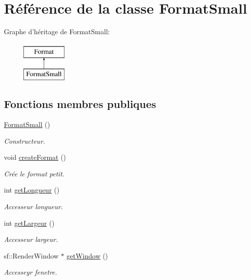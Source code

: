 \hypertarget{classFormatSmall}{\section{Référence de la classe Format\+Small}
\label{classFormatSmall}
}
Graphe d'héritage de Format\+Small\+:\begin{figure}[H]
\begin{center}
\leavevmode
\includegraphics[height=2.000000cm]{classFormatSmall}
\end{center}
\end{figure}
\subsection*{Fonctions membres publiques}
\begin{DoxyCompactItemize}
\item 
\hypertarget{classFormatSmall_aca8b600f88876ec205174cc61e65cca2}{\hyperlink{classFormatSmall_aca8b600f88876ec205174cc61e65cca2}{Format\+Small} ()}\label{classFormatSmall_aca8b600f88876ec205174cc61e65cca2}

\begin{DoxyCompactList}\small\item\em Constructeur. \end{DoxyCompactList}\item 
void \hyperlink{classFormatSmall_a985c6ed4ea1e16c267e0af5523dbba1f}{create\+Format} ()
\begin{DoxyCompactList}\small\item\em Crée le format petit. \end{DoxyCompactList}\item 
int \hyperlink{classFormatSmall_a755b6b4f2c5f6c2fc8b5a49f08c0ec29}{get\+Longueur} ()
\begin{DoxyCompactList}\small\item\em Accesseur longueur. \end{DoxyCompactList}\item 
int \hyperlink{classFormatSmall_a64623731eba4359b6c2e32019aba42f7}{get\+Largeur} ()
\begin{DoxyCompactList}\small\item\em Accesseur largeur. \end{DoxyCompactList}\item 
sf\+::\+Render\+Window $\ast$ \hyperlink{classFormatSmall_ab15677846852366fb6dbea77dc22e82c}{get\+Window} ()
\begin{DoxyCompactList}\small\item\em Accesseyr fenetre. \end{DoxyCompactList}\end{DoxyCompactItemize}


